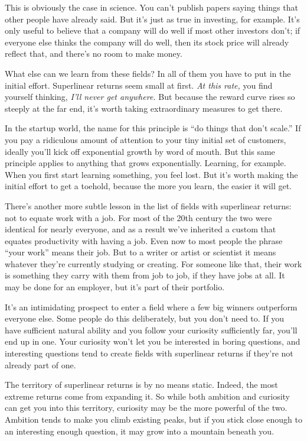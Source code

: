 \documentclass[12pt]{book}
\begin{document}
This is obviously the case in science. You can't publish papers saying
things that other people have already said. But it's just as true in
investing, for example. It's only useful to believe that a company will
do well if most other investors don't; if everyone else thinks the
company will do well, then its stock price will already reflect that,
and there's no room to make money.

What else can we learn from these fields? In all of them you have to put
in the initial effort. Superlinear returns seem small at first. \emph{At
this rate,} you find yourself thinking, \emph{I'll never get anywhere.}
But because the reward curve rises so steeply at the far end, it's worth
taking extraordinary measures to get there.

In the startup world, the name for this principle is ``do things that
don't scale.'' If you pay a ridiculous amount of attention to your tiny
initial set of customers, ideally you'll kick off exponential growth by
word of mouth. But this same principle applies to anything that grows
exponentially. Learning, for example. When you first start learning
something, you feel lost. But it's worth making the initial effort to
get a toehold, because the more you learn, the easier it will get.

There's another more subtle lesson in the list of fields with
superlinear returns: not to equate work with a job. For most of the 20th
century the two were identical for nearly everyone, and as a result
we've inherited a custom that equates productivity with having a job.
Even now to most people the phrase ``your work'' means their job. But to
a writer or artist or scientist it means whatever they're currently
studying or creating. For someone like that, their work is something
they carry with them from job to job, if they have jobs at all. It may
be done for an employer, but it's part of their portfolio.

It's an intimidating prospect to enter a field where a few big winners
outperform everyone else. Some people do this deliberately, but you
don't need to. If you have sufficient natural ability and you follow
your curiosity sufficiently far, you'll end up in one. Your curiosity
won't let you be interested in boring questions, and interesting
questions tend to create fields with superlinear returns if they're not
already part of one.

The territory of superlinear returns is by no means static. Indeed, the
most extreme returns come from expanding it. So while both ambition and
curiosity can get you into this territory, curiosity may be the more
powerful of the two. Ambition tends to make you climb existing peaks,
but if you stick close enough to an interesting enough question, it may
grow into a mountain beneath you.
\end{document}
